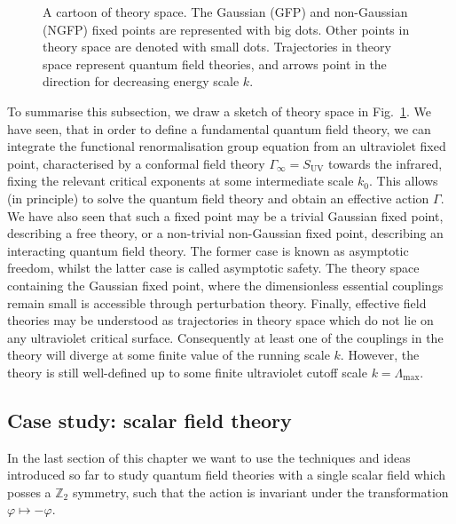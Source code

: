 \documentclass[11pt]{book}
\numberwithin{equation}{chapter}
\begin{document}
\begin{figure}
  \begin{center}
    
  \end{center}
  \vspace*{-4mm}
  \caption{
    A cartoon of theory space. The Gaussian (GFP) and non-Gaussian (NGFP)
    fixed points are represented with big dots. Other points in theory
    space are denoted with small dots. Trajectories in theory space
    represent quantum field theories, and arrows point in the direction
    for decreasing energy scale $k$.
  }
  \label{fig:theoryspace}
\end{figure}
\bigskip
\noindent
To summarise this subsection, we draw a sketch of theory
space in Fig.~\ref{fig:theoryspace}.
We have seen, that in order to define a fundamental
quantum field theory, we can integrate the functional
renormalisation group equation from an ultraviolet
fixed point, characterised by a conformal field theory
$\Gamma_\infty = S_{\mathrm{\scriptscriptstyle{UV}}}$
towards the infrared,
fixing the relevant critical exponents at some
intermediate scale $k_0$. This allows (in principle)
to solve the quantum field theory and obtain
an effective action $\Gamma$. We have also seen
that such a fixed point may be a trivial Gaussian
fixed point, describing
a free theory,
or a non-trivial non-Gaussian fixed point, describing an
interacting quantum field theory. The former case
is known as asymptotic freedom, whilst the latter case
is called asymptotic safety. The theory space containing
the Gaussian fixed point, where the dimensionless essential
couplings remain small is accessible through perturbation
theory. Finally, effective field theories may be understood
as trajectories in theory space which do not
lie on any ultraviolet critical surface.
Consequently at least one of the couplings in the theory will diverge
at some finite value of the running scale $k$.
However, the theory is still well-defined
up to some finite ultraviolet cutoff scale
$k=\Lambda_{\mathrm{\scriptscriptstyle{max}}}$.


\subsection{Case study: scalar field theory}
\label{sec:casestudy}

In the last section of this chapter we want to use
the techniques and ideas introduced so far to study
quantum field theories with a single scalar field
which posses a $\mathbb Z_2$ symmetry, such that the
action is invariant under the transformation
$\varphi \mapsto - \varphi$.
\end{document}
